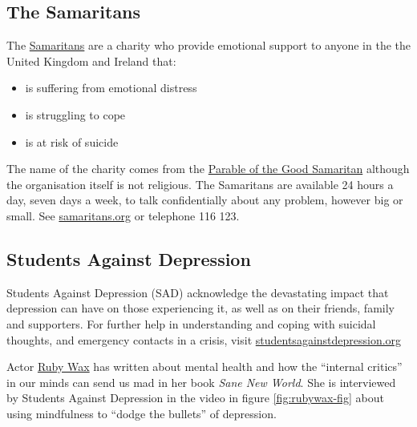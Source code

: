 \documentclass[
]{book}
\providecommand{\tightlist}{%
  \setlength{\itemsep}{0pt}\setlength{\parskip}{0pt}}
\begin{document}
\hypertarget{samaritans}{%
\subsection{The Samaritans}\label{samaritans}}

The \href{https://en.wikipedia.org/wiki/Samaritans_(charity)}{Samaritans} are a charity who provide emotional support to anyone in the the United Kingdom and Ireland that:

\begin{itemize}
\tightlist
\item
  is suffering from emotional distress
\item
  is struggling to cope
\item
  is at risk of suicide
\end{itemize}

The name of the charity comes from the \href{https://en.wikipedia.org/wiki/Parable_of_the_Good_Samaritan}{Parable of the Good Samaritan} although the organisation itself is not religious. The Samaritans are available 24 hours a day, seven days a week, to talk confidentially about any problem, however big or small. See \href{https://www.samaritans.org/}{samaritans.org} or telephone 116 123.

\hypertarget{sad}{%
\subsection{Students Against Depression}\label{sad}}

Students Against Depression (SAD) acknowledge the devastating impact that depression can have on those experiencing it, as well as on their friends, family and supporters. For further help in understanding and coping with suicidal thoughts, and emergency contacts in a crisis, visit \href{https://www.studentsagainstdepression.org/}{studentsagainstdepression.org}

Actor \href{https://en.wikipedia.org/wiki/Ruby_Wax}{Ruby Wax} has written about mental health and how the ``internal critics'' in our minds can send us mad in her book \emph{Sane New World}. \citep{sanenewworld} She is interviewed by Students Against Depression in the video in figure \ref{fig:rubywax-fig} about using mindfulness to ``dodge the bullets'' of depression.
\end{document}
